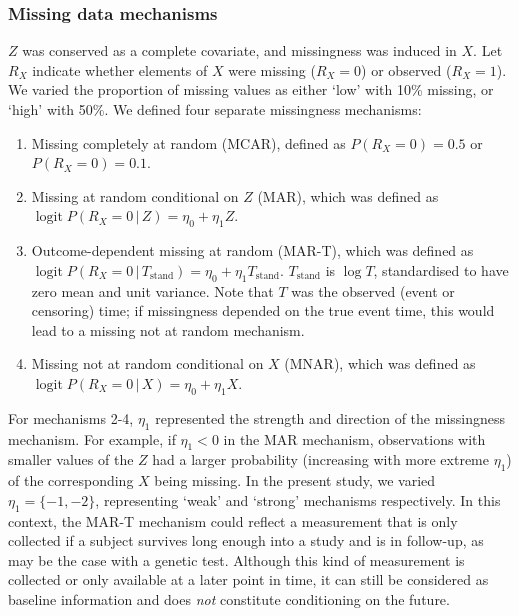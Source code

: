 \documentclass[
  letterpaper,
  paper=240mm:170mm,
  twoside=true,
  open=right,
  fontsize=10pt,
  pagesize=false,
  BCOR=15mm,
  DIV=14,
  headinclude=true,
  footinclude=false,
  headsepline=on]{scrbook}
\DeclareMathOperator{\logit}{logit}
\newcommand{\given}{\,|\,}
\begin{document}
\subsubsection{Missing data mechanisms}\label{missing-data-mechanisms}

\(Z\) was conserved as a complete covariate, and missingness was induced
in \(X\). Let \(R_X\) indicate whether elements of \(X\) were missing
(\(R_X = 0\)) or observed (\(R_X = 1\)). We varied the proportion of
missing values as either `low' with 10\% missing, or `high' with 50\%.
We defined four separate missingness mechanisms:

\begin{enumerate}
\def\labelenumi{\arabic{enumi}.}
\item
  Missing completely at random (MCAR), defined as \(P(R_X = 0) = 0.5\)
  or \(P(R_X = 0) = 0.1\).
\item
  Missing at random conditional on \(Z\) (MAR), which was defined as
  \(\logit P(R_X = 0 \given Z) = \eta_0 + \eta_1 Z\).
\item
  Outcome-dependent missing at random (MAR-T), which was defined as
  \(\logit P(R_X = 0 \given T_{\text{stand}}) = \eta_0 + \eta_1 T_{\text{stand}}\).
  \(T_{\text{stand}}\) is \(\log T\), standardised to have zero mean and
  unit variance. Note that \(T\) was the observed (event or censoring)
  time; if missingness depended on the true event time, this would lead
  to a missing not at random mechanism.
\item
  Missing not at random conditional on \(X\) (MNAR), which was defined
  as \(\logit P(R_X = 0 \given X) = \eta_0 + \eta_1 X\).
\end{enumerate}

For mechanisms 2-4, \(\eta_1\) represented the strength and direction of
the missingness mechanism. For example, if \(\eta_1 < 0\) in the MAR
mechanism, observations with smaller values of the \(Z\) had a larger
probability (increasing with more extreme \(\eta_1\)) of the
corresponding \(X\) being missing. In the present study, we varied
\(\eta_1 = \{-1, -2\}\), representing `weak' and `strong' mechanisms
respectively. In this context, the MAR-T mechanism could reflect a
measurement that is only collected if a subject survives long enough
into a study and is in follow-up, as may be the case with a genetic
test. Although this kind of measurement is collected or only available
at a later point in time, it can still be considered as baseline
information and does \emph{not} constitute conditioning on the future.
\end{document}
